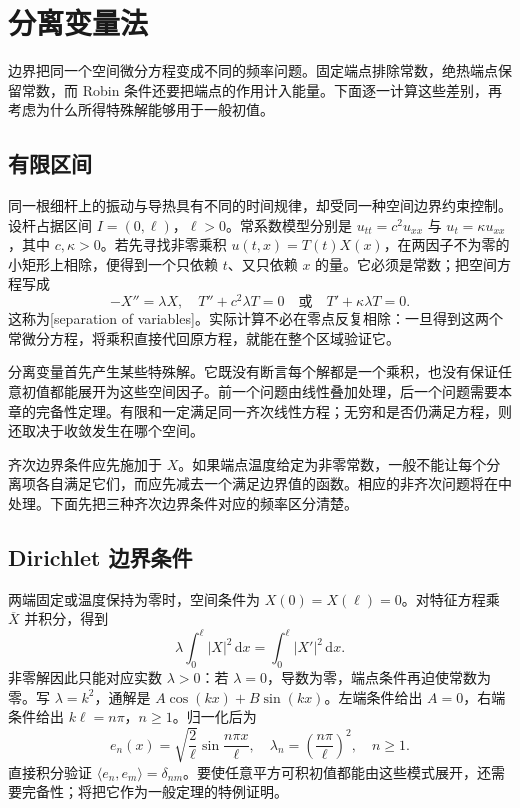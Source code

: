 \section{分离变量法}
\label{b2:sec:1001}

边界把同一个空间微分方程变成不同的频率问题。固定端点排除常数，绝热端点保留常数，而 Robin 条件还要把端点的作用计入能量。下面逐一计算这些差别，再考虑为什么所得特殊解能够用于一般初值。

\subsection{有限区间}
\label{b2:subsec:100101}

同一根细杆上的振动与导热具有不同的时间规律，却受同一种空间边界约束控制。设杆占据区间 \(I=(0,\ell)\)，\(\ell>0\)。常系数模型分别是 \(u_{tt}=c^2u_{xx}\) 与 \(u_t=\kappa u_{xx}\)，其中 \(c,\kappa>0\)。若先寻找非零乘积 \(u(t,x)=T(t)X(x)\)，在两因子不为零的小矩形上相除，便得到一个只依赖 \(t\)、又只依赖 \(x\) 的量。它必须是常数；把空间方程写成
\[
 -X''=\lambda X,
 \quad T''+c^2\lambda T=0
 \quad\text{或}\quad T'+\kappa\lambda T=0.
\]
这称为[separation of variables]。实际计算不必在零点反复相除：一旦得到这两个常微分方程，将乘积直接代回原方程，就能在整个区域验证它。

\ProseParagraphBreak

分离变量首先产生某些特殊解。它既没有断言每个解都是一个乘积，也没有保证任意初值都能展开为这些空间因子。前一个问题由线性叠加处理，后一个问题需要本章的完备性定理。有限和一定满足同一齐次线性方程；无穷和是否仍满足方程，则还取决于收敛发生在哪个空间。

\ProseParagraphBreak

齐次边界条件应先施加于 \(X\)。如果端点温度给定为非零常数，一般不能让每个分离项各自满足它们，而应先减去一个满足边界值的函数。相应的非齐次问题将在中处理。下面先把三种齐次边界条件对应的频率区分清楚。

\subsection{Dirichlet 边界条件}
\label{b2:subsec:100102}

两端固定或温度保持为零时，空间条件为 \(X(0)=X(\ell)=0\)。对特征方程乘 \(\overline X\) 并积分，得到
\[
 \lambda\int_0^\ell |X|^2\,\mathrm{d}x
 =\int_0^\ell |X'|^2\,\mathrm{d}x.
\]
非零解因此只能对应实数 \(\lambda>0\)：若 \(\lambda=0\)，导数为零，端点条件再迫使常数为零。写 \(\lambda=k^2\)，通解是 \(A\cos(kx)+B\sin(kx)\)。左端条件给出 \(A=0\)，右端条件给出 \(k\ell=n\pi\)，\(n\geq1\)。归一化后为
\begin{equation}\label{b2:eq:10-dirichlet-modes}
 e_n(x)=\sqrt{\dfrac2\ell}\sin\dfrac{n\pi x}{\ell},
 \quad\lambda_n=\left(\dfrac{n\pi}{\ell}\right)^2,
 \quad n\geq1.
\end{equation}
直接积分验证 \(\langle e_n,e_m\rangle=\delta_{nm}\)。要使任意平方可积初值都能由这些模式展开，还需要完备性；将把它作为一般定理的特例证明。

